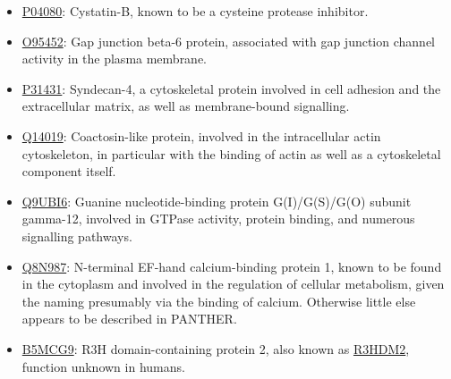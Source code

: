 \begin{itemize}
\item \href{http://www.pantherdb.org/genes/gene.do?acc=HUMAN\%7CHGNC\%3D2482\%7CUniProtKB\%3DP04080}{P04080}: Cystatin-B, known to be a cysteine protease inhibitor.
\item \href{http://www.pantherdb.org/genes/gene.do?acc=HUMAN\%7CHGNC\%3D4288\%7CUniProtKB\%3DO95452}{O95452}: Gap junction beta-6 protein, associated with gap junction channel activity in the plasma membrane.
\item \href{http://www.pantherdb.org/genes/gene.do?acc=HUMAN\%7CHGNC\%3D10661\%7CUniProtKB\%3DP31431}{P31431}: Syndecan-4, a cytoskeletal protein involved in cell adhesion and the extracellular matrix, as well as membrane-bound signalling.
\item \href{http://www.pantherdb.org/genes/gene.do?acc=HUMAN\%7CHGNC\%3D18304\%7CUniProtKB\%3DQ14019}{Q14019}: Coactosin-like protein, involved in the intracellular actin cytoskeleton, in particular with the binding of actin as well as a cytoskeletal component itself.
\item \href{http://www.pantherdb.org/genes/gene.do?acc=HUMAN\%7CHGNC\%3D19663\%7CUniProtKB\%3DQ9UBI6}{Q9UBI6}: Guanine nucleotide-binding protein G(I)/G(S)/G(O) subunit gamma-12, involved in GTPase activity, protein binding, and numerous signalling pathways.
\item \href{http://www.pantherdb.org/genes/gene.do?acc=HUMAN\%7CHGNC\%3D20983\%7CUniProtKB\%3DQ8N987}{Q8N987}: N-terminal EF-hand calcium-binding protein 1, known to be found in the cytoplasm and involved in the regulation of cellular metabolism, given the naming presumably via the binding of calcium. Otherwise little else appears to be described in PANTHER.
\item \href{http://www.pantherdb.org/genes/gene.do?acc=HUMAN\%7CHGNC\%3D29167\%7CUniProtKB\%3DQ9Y2K5}{B5MCG9}: R3H domain-containing protein 2, also known as \href{https://www.uniprot.org/uniprot/B5MCG9}{R3HDM2}, function unknown in humans.
\end{itemize}



\pagebreak






